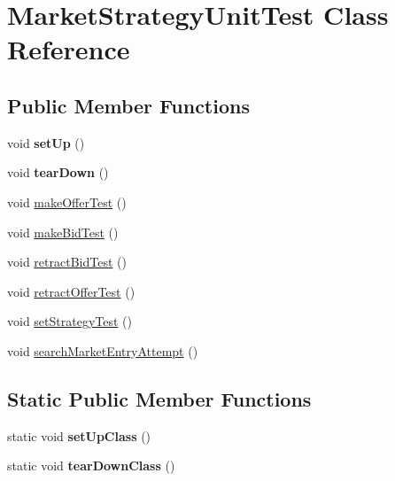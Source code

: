 \hypertarget{class_market_strategy_unit_test}{\section{Market\+Strategy\+Unit\+Test Class Reference}
\label{class_market_strategy_unit_test}
}
\subsection*{Public Member Functions}
\begin{DoxyCompactItemize}
\item 
\hypertarget{class_market_strategy_unit_test_aab34abed7a4e3829160450b21793da17}{void {\bfseries set\+Up} ()}\label{class_market_strategy_unit_test_aab34abed7a4e3829160450b21793da17}

\item 
\hypertarget{class_market_strategy_unit_test_afa4e0a0e8292236fbcf994dc042741fb}{void {\bfseries tear\+Down} ()}\label{class_market_strategy_unit_test_afa4e0a0e8292236fbcf994dc042741fb}

\item 
void \hyperlink{class_market_strategy_unit_test_ab814f5c9983e0eaa02f7c5040b81971a}{make\+Offer\+Test} ()
\item 
void \hyperlink{class_market_strategy_unit_test_a98b0ebe10401ed5d3c9af160dfcb8f2a}{make\+Bid\+Test} ()
\item 
void \hyperlink{class_market_strategy_unit_test_aa0b0a03a9824cd06bc94c68d9c45042f}{retract\+Bid\+Test} ()
\item 
void \hyperlink{class_market_strategy_unit_test_a045225ba03abd2845f49e6c0e065712a}{retract\+Offer\+Test} ()
\item 
void \hyperlink{class_market_strategy_unit_test_ac701e483e622d7a918f1b8f21f024108}{set\+Strategy\+Test} ()
\item 
void \hyperlink{class_market_strategy_unit_test_a090ee23fae74dd8351ad91f17c784627}{search\+Market\+Entry\+Attempt} ()
\end{DoxyCompactItemize}
\subsection*{Static Public Member Functions}
\begin{DoxyCompactItemize}
\item 
\hypertarget{class_market_strategy_unit_test_ab6f9926edcaa9511516b0b3bb1025b9f}{static void {\bfseries set\+Up\+Class} ()}\label{class_market_strategy_unit_test_ab6f9926edcaa9511516b0b3bb1025b9f}

\item 
\hypertarget{class_market_strategy_unit_test_aeb485798bfb7f18a04b6355e6f2a2581}{static void {\bfseries tear\+Down\+Class} ()}\label{class_market_strategy_unit_test_aeb485798bfb7f18a04b6355e6f2a2581}

\end{DoxyCompactItemize}


